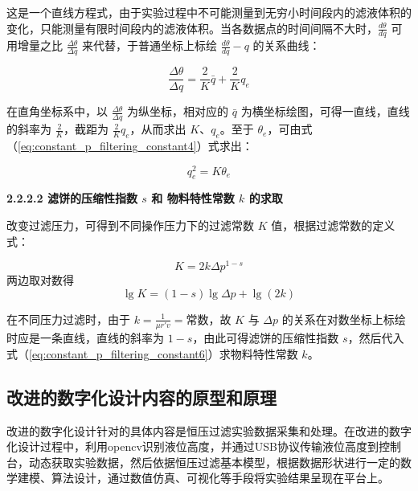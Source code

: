这是一个直线方程式，由于实验过程中不可能测量到无穷小时间段内的滤液体积的变化，只能测量有限时间段内的滤液体积。当各数据点的时间间隔不大时，$\frac{d \theta}{d q}$ 可用增量之比 $\frac{\Delta \theta}{\Delta q}$ 来代替，于普通坐标上标绘 $\frac{d \theta}{d q} - q$ 的关系曲线：

\begin{equation}
    \frac{\Delta \theta}{\Delta q} = \frac{2}{K} \bar{q} + \frac{2}{K} q_e
    \label{eq:constant_p_filtering_constant3}
\end{equation}

在直角坐标系中，以 $\frac{\Delta \theta}{\Delta q}$ 为纵坐标，相对应的 $\bar{q}$ 为横坐标绘图，可得一直线，直线的斜率为 $\frac{2}{K}$，截距为 $\frac{2}{K} q_e$，从而求出 $K$、$q_e$。至于 $\theta_e$，可由式（\ref{eq:constant_p_filtering_constant4}）式求出：

\begin{equation}
    q_e^2 = K \theta_e
    \label{eq:constant_p_filtering_constant4}
\end{equation}

{\noindent \wuhao \rmfamily {} \textbf{2.2.2.2 \quad 滤饼的压缩性指数 $s$ 和 物料特性常数 $k$ 的求取}}

改变过滤压力，可得到不同操作压力下的过滤常数 $K$ 值，根据过滤常数的定义式：

\begin{equation}
    K = 2k \Delta p^{1-s}
    \label{eq:constant_p_filtering_constant5}
\end{equation}
两边取对数得
\begin{equation}
    \lg K = (1-s)\lg \Delta p + \lg (2k)
    \label{eq:constant_p_filtering_constant6}
\end{equation}

在不同压力过滤时，由于 $k = \frac{1}{\mu r' v} = \text{常数}$，故 $K$ 与 $\Delta p$ 的关系在对数坐标上标绘时应是一条直线，直线的斜率为 $1-s$，由此可得滤饼的压缩性指数 $s$，然后代入式（\ref{eq:constant_p_filtering_constant6}）求物料特性常数 $k$。

\subsection{改进的数字化设计内容的原型和原理}


改进的数字化设计针对的具体内容是恒压过滤实验数据采集和处理。在改进的数字化设计过程中，利用opencv识别液位高度，并通过USB协议传输液位高度到控制台，动态获取实验数据，然后依据恒压过滤基本模型，根据数据形状进行一定的数学建模、算法设计，通过数值仿真、可视化等手段将实验结果呈现在平台上。

